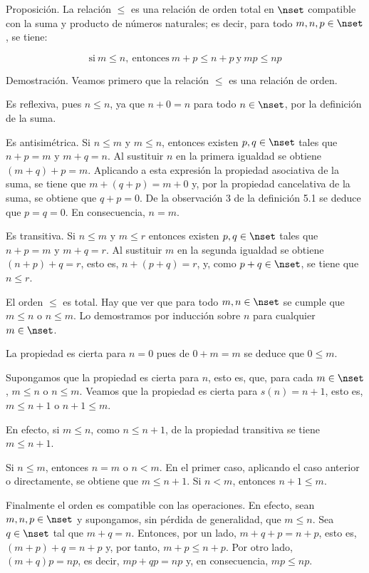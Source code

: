 Proposición. La relación $\leq$ es una relación de orden total en $\nset$
compatible con la suma y producto de números naturales; es decir, para todo
$m, n, p \in \nset$, se tiene:

$$ \text{si} \ m \leq n, \ \text{entonces} \ m + p \leq n + p \ \text{y} \
mp \leq np $$

Demostración. Veamos primero que la relación $\leq$ es una relación de
orden.

Es reflexiva, pues $n \leq n$, ya que $n + 0 = n$ para todo $n \in \nset$,
por la definición de la suma.

Es antisimétrica. Si $n \leq m$ y $m \leq n$, entonces existen $p, q \in
\nset$ tales que $n + p = m$ y $m + q = n$. Al sustituir $n$ en la primera
igualdad se obtiene $(m + q) + p = m$. Aplicando a esta expresión la
propiedad asociativa de la suma, se tiene que $m + (q + p) = m + 0$ y, por
la propiedad cancelativa de la suma, se obtiene que $q + p = 0$. De la
observación 3 de la definición 5.1 se deduce que $p = q = 0$. En
consecuencia, $n = m$.

Es transitiva. Si $n \leq m$ y $m \leq r$ entonces existen $p, q \in \nset$
tales que $n + p = m$ y $m + q = r$. Al sustituir $m$ en la segunda igualdad
se obtiene $(n + p) + q = r$, esto es, $n + (p + q) = r$, y, como $p + q \in
\nset$, se tiene que $n \leq r$.

El orden $\leq$ es total. Hay que ver que para todo $m, n \in \nset$ se
cumple que $m \leq n$ o $n \leq m$. Lo demostramos por inducción sobre $n$
para cualquier $m \in \nset$.

La propiedad es cierta para $n = 0$ pues de $0 + m = m$ se deduce que $0
\leq m$.

Supongamos que la propiedad es cierta para $n$, esto es, que, para cada $m
\in \nset$, $m \leq n$ o $n \leq m$. Veamos que la propiedad es cierta para
$s(n) = n + 1$, esto es, $m \leq n + 1$ o $n + 1 \leq m$.

En efecto, si $m \leq n$, como $n \leq n + 1$, de la propiedad transitiva se
tiene $m \leq n + 1$.

Si $n \leq m$, entonces $n = m$ o $n < m$. En el primer caso, aplicando el
caso anterior o directamente, se obtiene que $m \leq n + 1$. Si $n < m$,
entonces $n + 1 \leq m$.

Finalmente el orden es compatible con las operaciones. En efecto, sean $m,
n, p \in \nset$ y supongamos, sin pérdida de generalidad, que $m \leq n$.
Sea $q \in \nset$ tal que $m + q = n$. Entonces, por un lado, $m + q + p = n
+ p$, esto es, $(m + p) + q = n + p$ y, por tanto, $m + p \leq n + p$. Por
otro lado, $(m + q)p = np$, es decir, $mp + qp = np$ y, en consecuencia, $mp
\leq np$.

